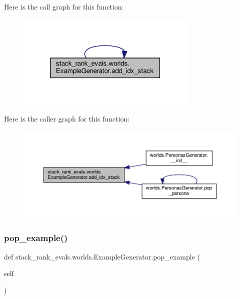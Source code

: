 Here is the call graph for this function\+:
\nopagebreak
\begin{figure}[H]
\begin{center}
\leavevmode
\includegraphics[width=244pt]{classstack__rank__evals_1_1worlds_1_1ExampleGenerator_a9bc7f39d14003d695ad66b624607dc05_cgraph}
\end{center}
\end{figure}
Here is the caller graph for this function\+:
\nopagebreak
\begin{figure}[H]
\begin{center}
\leavevmode
\includegraphics[width=350pt]{classstack__rank__evals_1_1worlds_1_1ExampleGenerator_a9bc7f39d14003d695ad66b624607dc05_icgraph}
\end{center}
\end{figure}
\mbox{\label{classstack__rank__evals_1_1worlds_1_1ExampleGenerator_ae50d35087dd679c73aa8f5354845199f}} 
\subsubsection{\texorpdfstring{pop\+\_\+example()}{pop\_example()}\hspace{0.1cm}{\footnotesize\ttfamily [1/2]}}
{\footnotesize\ttfamily def stack\+\_\+rank\+\_\+evals.\+worlds.\+Example\+Generator.\+pop\+\_\+example (\begin{DoxyParamCaption}\item[{}]{self }\end{DoxyParamCaption})}



